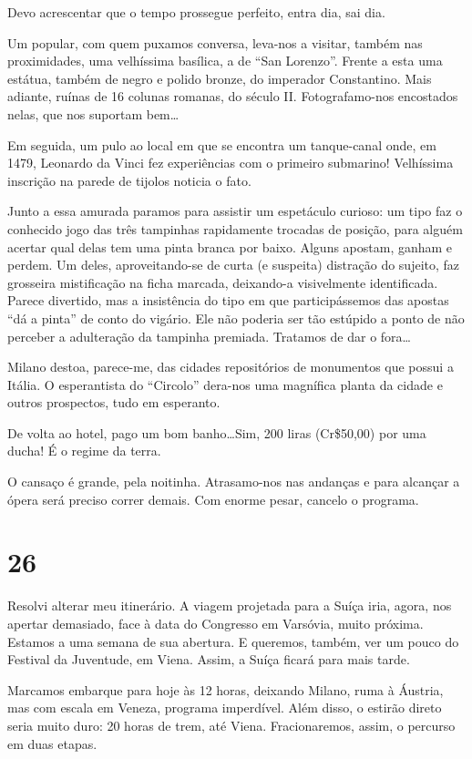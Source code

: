 Devo acrescentar que o tempo prossegue perfeito, entra dia, sai dia.

Um popular, com quem puxamos conversa, leva-nos a visitar, também nas proximidades, uma velhíssima basílica, a de “San Lorenzo”. Frente a esta uma estátua, também de negro e polido bronze, do imperador Constantino. Mais adiante, ruínas de 16 colunas romanas, do século II. Fotografamo-nos encostados nelas, que nos suportam bem\ldots

Em seguida, um pulo ao local em que se encontra um tanque-canal onde, em 1479, Leonardo da Vinci fez experiências com o primeiro submarino! Velhíssima inscrição na parede de tijolos noticia o fato.

Junto a essa amurada paramos para assistir um espetáculo curioso: um tipo faz o conhecido jogo das três tampinhas rapidamente trocadas de posição, para alguém acertar qual delas tem uma pinta branca por baixo. Alguns apostam, ganham e perdem. Um deles, aproveitando-se de curta (e suspeita) distração do sujeito, faz grosseira mistificação na ficha marcada, deixando-a visivelmente identificada. Parece divertido, mas a insistência do tipo em que participássemos das apostas “dá a pinta” de conto do vigário. Ele não poderia ser tão estúpido a ponto de não perceber a adulteração da tampinha premiada. Tratamos de dar o fora\ldots

Milano destoa, parece-me, das cidades repositórios de monumentos que possui a Itália. O esperantista do “Circolo” dera-nos uma magnífica planta da cidade e outros prospectos, tudo em esperanto.

De volta ao hotel, pago um bom banho\ldots Sim, 200 liras (Cr\$50,00) por uma ducha! É o regime da terra.

O cansaço é grande, pela noitinha. Atrasamo-nos nas andanças e para alcançar a ópera será preciso correr demais. Com enorme pesar, cancelo o programa.

\section*{26 \adfflatleafright {}}
Resolvi alterar meu itinerário. A viagem projetada para a Suíça iria, agora, nos apertar demasiado, face à data do Congresso em Varsóvia, muito próxima. Estamos a uma semana de sua abertura. E queremos, também, ver um pouco do Festival da Juventude, em Viena. Assim, a Suíça ficará para mais tarde.

Marcamos embarque para hoje às 12 horas, deixando Milano, ruma à Áustria, mas com escala em Veneza, programa imperdível. Além disso, o estirão direto seria muito duro: 20 horas de trem, até Viena. Fracionaremos, assim, o percurso em duas etapas.

